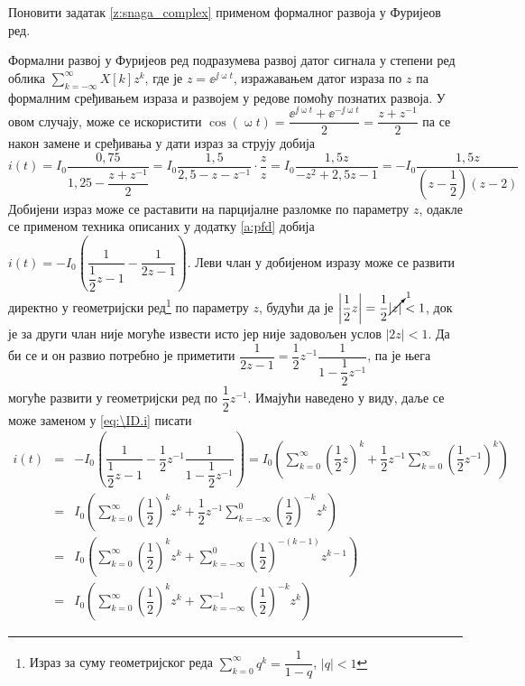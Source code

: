 \PID Поновити задатак \ref{z:snaga_complex} применом формалног развоја у Фуријеов ред. 

\RESENJE

Формални развој у Фуријеов ред подразумева развој датог сигнала у степени ред облика 
$\sum_{k = -\infty}^{\infty} X[k] z^{k}$, где је $z = \ee^{\jj\upomega t}$, изражавањем датог израза по 
$z$ па формалним сређивањем израза и развојем у редове помоћу познатих развоја. У овом случају, може се искористити $\cos(\upomega t) = \dfrac{\ee^{\jj\upomega t} + \ee^{-\jj\upomega t}}{2} 
= \dfrac{z + z^{-1}}{2}$ па се након замене и сређивања у дати израз за струју добија 
\begin{equation}
    i(t) = I_0 \dfrac{0,75}{1,25 - \dfrac{z + z^{-1}}{2} } 
         = I_0 \dfrac{1,5}{2,5 - z - z^{-1}}  
         \cdot 
         \dfrac{z}{z}
         = I_0 \dfrac{1,5 z}{ -z^2 + 2,5 z - 1 } 
         =  -I_0 \dfrac{1,5 z}{ \left( z - \dfrac{1}{2} \right) (z - 2) } \label{eq:\ID.i}
\end{equation}
Добијени израз може се раставити на парцијалне разломке по параметру $z$, одакле се применом техника описаних 
у додатку \ref{a:pfd} добија 
$
    i(t) = -I_0 \left( \dfrac{1}{\dfrac{1}{2}z - 1} - \dfrac{1}{2z - 1} \right). 
$ Леви члан у добијеном изразу може се развити директно у геометријски ред\footnote{Израз за суму геометријског реда 
$\sum_{k = 0}^{\infty} q^k = \dfrac{1}{1 - q}$, $|q| < 1$ } по параметру $z$, будући да је 
$\left\lvert\dfrac{1}{2} z\right\rvert = \dfrac{1}{2} \cancelto{1}{|z|}  < 1$, док је 
за други члан није могуће извести исто јер није задовољен услов $|2z| < 1$. Да би се и он развио потребно је приметити
$
\dfrac{1}{2z - 1} = \dfrac{1}{2}z^{-1} \dfrac{1}{1 - \dfrac{1}{2}z^{-1} }
$, па је њега могуће развити у геометријски ред по $\dfrac{1}{2}z^{-1}$. Имајући наведено у виду, даље се може 
заменом у \eqref{eq:\ID.i} писати
\begin{eqnarray}
    i(t) &=& -I_0 \left(
        \dfrac{1}{\dfrac{1}{2}z - 1} - \dfrac{1}{2}z^{-1} \dfrac{1}{1 - \dfrac{1}{2}z^{-1} }    
    \right) = I_0 \left(
      \sum_{k = 0}^{\infty} \left(\dfrac{1}{2}z \right)^k + \dfrac{1}{2} z^{-1} \sum_{k = 0}^{\infty} \left(\dfrac{1}{2} z^{-1} \right)^k     
    \right) \\[2mm]
    &=&
    I_0 \left(
        \sum_{k = 0}^{\infty} \left(\dfrac{1}{2} \right)^k z^k + \dfrac{1}{2} z^{-1} \sum_{k = -\infty}^{0} \left(\dfrac{1}{2}\right)^{-k} z^{k}     
    \right)
    \\[2mm] &=&
    I_0 \left(
        \sum_{k = 0}^{\infty} \left(\dfrac{1}{2} \right)^k z^k + \sum_{k = -\infty}^{0} \left(\dfrac{1}{2}\right)^{-(k-1)} z^{k-1}     
    \right) \\[2mm]
        &=&
    I_0 \left(
        \sum_{k = 0}^{\infty} \left(\dfrac{1}{2} \right)^k z^k + \sum_{k = -\infty}^{-1} \left(\dfrac{1}{2}\right)^{-k} z^k     
    \right)
\end{eqnarray}
